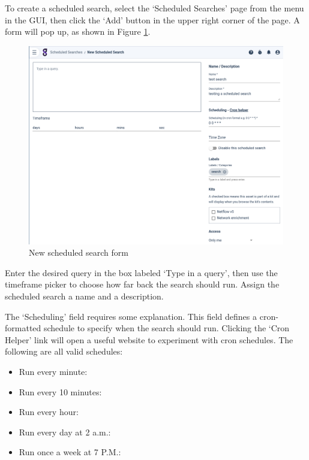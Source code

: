 To create a scheduled search, select the `Scheduled Searches' page from
the menu in the GUI, then click the `Add' button in the upper right
corner of the page. A form will pop up, as shown in Figure \ref{fig:new-scheduled}.

\begin{figure}
	\includegraphics{images/new-scheduled.png}
	\caption{New scheduled search form}
	\label{fig:new-scheduled}
\end{figure}

Enter the desired query in the box labeled `Type in a query', then use
the timeframe picker to choose how far back the search should run.
Assign the scheduled search a name and a description.

The `Scheduling' field requires some explanation. This field defines a
cron-formatted schedule to specify when the search should run. Clicking
the `Cron Helper' link will open a useful website to experiment with
cron schedules. The following are all valid schedules:

\begin{itemize}
\tightlist
\item
  Run every minute: \code{* * * * *}
\item
  Run every 10 minutes: 
\item
  Run every hour: 
\item
  Run every day at 2 a.m.: 
\item
  Run once a week at 7 P.M.: 
\end{itemize}


